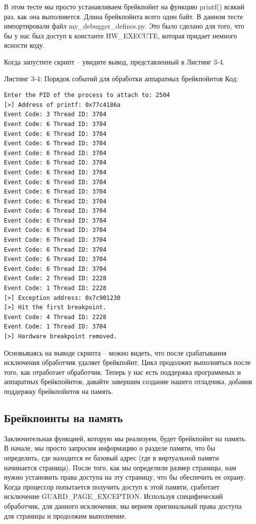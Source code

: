 \documentclass[12pt]{book}
\begin{document}
В этом тесте мы просто устанавливаем брейкпойнт на функцию printf() всякий раз, как она выполняется. Длина брейкпойнта всего один байт. В данном тесте импортировали файл my\_debugger\_defines.py. Это было сделано для того, что бы у нас был доступ к константе HW\_EXECUTE, которая придает немного ясности коду.

Когда запустите скрипт – увидите вывод, представленный в Листинг 3-4.

Листинг 3-4: Порядок событий для обработки аппаратных брейкпойнтов
Код:
\begin{lstlisting}
Enter the PID of the process to attach to: 2504
[>] Address of printf: 0x77c4186a
Event Code: 3 Thread ID: 3704
Event Code: 6 Thread ID: 3704
Event Code: 6 Thread ID: 3704
Event Code: 6 Thread ID: 3704
Event Code: 6 Thread ID: 3704
Event Code: 6 Thread ID: 3704
Event Code: 6 Thread ID: 3704
Event Code: 6 Thread ID: 3704
Event Code: 6 Thread ID: 3704
Event Code: 6 Thread ID: 3704
Event Code: 6 Thread ID: 3704
Event Code: 6 Thread ID: 3704
Event Code: 6 Thread ID: 3704
Event Code: 6 Thread ID: 3704
Event Code: 6 Thread ID: 3704
Event Code: 6 Thread ID: 3704
Event Code: 6 Thread ID: 3704
Event Code: 2 Thread ID: 2228
Event Code: 1 Thread ID: 2228
[>] Exception address: 0x7c901230
[>] Hit the first breakpoint.
Event Code: 4 Thread ID: 2228
Event Code: 1 Thread ID: 3704
[>] Hardware breakpoint removed.
\end{lstlisting}

Основываясь на выводе скрипта – можно видеть, что после срабатывания исключения обработчик удаляет брейкпойнт. Цикл продолжит выполняться после того, как отработает обработчик. Теперь у нас есть поддержка программных и аппаратных брейкпойнтов, давайте завершим создание нашего отладчика, добавив поддержку брейкпойнтов на память.

\subsection{Брейкпоинты на память}

Заключительная функцией, которую мы реализуем, будет брейкпойнт на память. В начале, мы просто запросим информацию о разделе памяти, что бы определить, где находится ее базовый адрес (где в виртуальной памяти начинается страница). После того, как мы определили размер страницы, нам нужно установить права доступа на эту страницу, что бы обеспечить ее охрану. Когда процессор попытается получить доступ к этой памяти, сработает исключение GUARD\_PAGE\_EXCEPTION. Используя специфический обработчик, для данного исключения, мы вернем оригинальный права доступа для страницы и продолжим выполнение.
\end{document}
